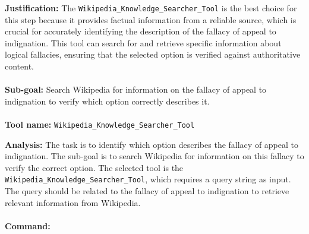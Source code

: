 \begin{plannerbox}

\textbf{Justification:}
The \texttt{Wikipedia\_Knowledge\_Searcher\_Tool} is the best choice for this step because it provides factual information from a reliable source, which is crucial for accurately identifying the description of the fallacy of appeal to indignation. This tool can search for and retrieve specific information about logical fallacies, ensuring that the selected option is verified against authoritative content.
\\\\
\textbf{Sub-goal:}
Search Wikipedia for information on the fallacy of appeal to indignation to verify which option correctly describes it.
\\\\
\textbf{Tool name:} \texttt{Wikipedia\_Knowledge\_Searcher\_Tool}
\end{plannerbox}


\begin{executorbox}

\textbf{Analysis:}
The task is to identify which option describes the fallacy of appeal to indignation. The sub-goal is to search Wikipedia for information on this fallacy to verify the correct option. The selected tool is the \texttt{Wikipedia\_Knowledge\_Searcher\_Tool}, which requires a query string as input. The query should be related to the fallacy of appeal to indignation to retrieve relevant information from Wikipedia.
\\\\
\textbf{Command:}
\end{executorbox}


